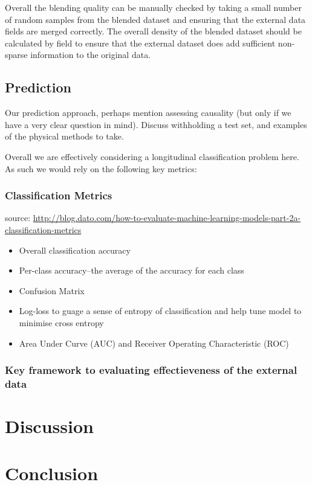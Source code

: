 \documentclass{article}
\begin{document}
\noindent Overall the blending quality can be manually checked by taking 
a small number of random samples from the blended dataset and ensuring that the 
external data fields are merged correctly. The overall density of the blended 
dataset should be calculated by field to ensure that the external dataset does 
add sufficient non-sparse information to the original data.

\subsection{Prediction}

Our prediction approach, perhaps mention assessing causality (but only if we 
have a very clear question in mind). Discuss withholding a test set, and 
examples of the physical methods to take.

\noindent Overall we are effectively considering a longitudinal classification
problem here. As such we would rely on the following key metrics:

\subsubsection{Classification Metrics}
source: \url{http://blog.dato.com/how-to-evaluate-machine-learning-models-part-2a-classification-metrics}
\begin{itemize}
  \item  Overall classification accuracy
  \item  Per-class accuracy--the average of the accuracy for each class
  \item  Confusion Matrix
  \item  Log-loss to guage a sense of entropy of classification and help tune 
         model to minimise cross entropy
  \item  Area Under Curve (AUC) and Receiver Operating Characteristic (ROC)
\end{itemize}

\subsubsection{Key framework to evaluating effectieveness of the external data}

\noindent


\section{Discussion}

\section{Conclusion}
\end{document}
